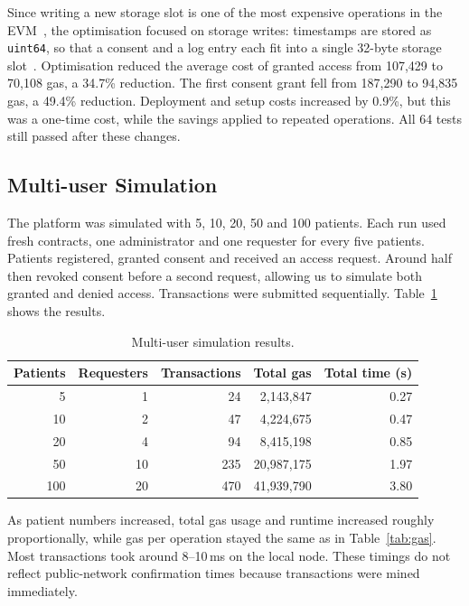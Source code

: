 \documentclass[10pt,a4paper]{article}
\begin{document}
Since writing a new storage slot is one of the most expensive operations in the EVM~\cite{yellowpaper,eip2929}, the optimisation focused on storage writes: timestamps are stored as \texttt{uint64}, so that a consent and a log entry each fit into a single 32-byte storage slot~\cite{soliditydocs}. Optimisation reduced the average cost of granted access from 107,429 to 70,108 gas, a 34.7\% reduction. The first consent grant fell from 187,290 to 94,835 gas, a 49.4\% reduction. Deployment and setup costs increased by 0.9\%, but this was a one-time cost, while the savings applied to repeated operations. All 64 tests still passed after these changes.

\subsection{Multi-user Simulation}
\label{sec:simulation}

The platform was simulated with 5, 10, 20, 50 and 100 patients. Each run used fresh contracts, one administrator and one requester for every five patients. Patients registered, granted consent and received an access request. Around half then revoked consent before a second request, allowing us to simulate both granted and denied access. Transactions were submitted sequentially. Table~\ref{tab:sim} shows the results.

\begin{table}[htbp]
  \centering
  \footnotesize
  \begin{tabular}{rrrrr}
    \toprule
    \textbf{Patients} & \textbf{Requesters} & \textbf{Transactions} & \textbf{Total gas} & \textbf{Total time (s)} \\
    \midrule
    5   & 1  & 24  & 2,143,847  & 0.27 \\
    10  & 2  & 47  & 4,224,675  & 0.47 \\
    20  & 4  & 94  & 8,415,198  & 0.85 \\
    50  & 10 & 235 & 20,987,175 & 1.97 \\
    100 & 20 & 470 & 41,939,790 & 3.80 \\
    \bottomrule
  \end{tabular}
  \caption{Multi-user simulation results.}
  \label{tab:sim}
\end{table}

As patient numbers increased, total gas usage and runtime increased roughly proportionally, while gas per operation stayed the same as in Table~\ref{tab:gas}. Most transactions took around 8--10\,ms on the local node. These timings do not reflect public-network confirmation times because transactions were mined immediately.
\end{document}
